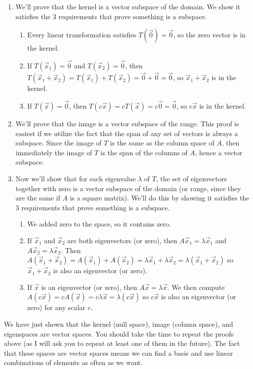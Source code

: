 \documentclass[10pt]{article}
\theoremstyle{plain}
\theoremstyle{box}
\begin{document}
\begin{enumerate}
	\item We'll prove that the kernel is a vector subspace of the domain. We show it satisfies the 3 requirements that prove something is a subspace. 
\begin{enumerate}
	\item Every linear transformation satisfies $T(\vec 0)=\vec 0$, so the zero vector is in the kernel.  
	\item If $T(\vec x_1)=\vec 0$ and $T(\vec x_2)=\vec 0$, then $T(\vec x_1+\vec x_2)=T(\vec x_1)+T(\vec x_2)=\vec 0+\vec 0=\vec 0$, so $\vec x_1+\vec x_2$ is in the kernel. 
	\item If $T(\vec x)=\vec 0$, then $T(c\vec x)=cT(\vec x)=c\vec 0=\vec 0$, so $c\vec x$ is in the kernel. 
\end{enumerate}

	\item We'll prove that the image is a vector subspace of the range. This proof is easiest if we utilize the fact that the span of any set of vectors is always a subspace.  Since the image of $T$ is the same as the column space of $A$, then immediately the image of $T$ is the span of the columns of $A$, hence a vector subspace.
	
	\item Now we'll show that for each eigenvalue $\lambda$ of $T$, the set of eigenvectors together with zero is a vector subspace of the domain (or range, since they are the same if $A$ is a square matrix).  We'll do this by showing it satisfies the 3 requirements that prove something is a subspace.
\begin{enumerate}
	\item We added zero to the space, so it contains zero.
	\item If $\vec x_1$ and $\vec x_2$ are both eigenvectors (or zero), then $A\vec x_1=\lambda \vec x_1$ and $A\vec x_2=\lambda \vec x_2$. Then $A(\vec x_1+\vec x_2)=A(\vec x_1)+A(\vec x_2)=\lambda \vec x_1+\lambda \vec x_2 = \lambda (\vec x_1+\vec x_2)$ so $\vec x_1+\vec x_2$ is also an eigenvector (or zero).
	\item If $\vec x$ is an eigenvector (or zero), then $A\vec x=\lambda \vec x$. We then compute $A(c\vec x)=cA(\vec x)=c\lambda \vec x= \lambda (c\vec x)$ so $c\vec x$ is also an eigenvector (or zero) for any scalar $c$.
\end{enumerate}
\end{enumerate}

We have just shown that the kernel (null space), image (column space), and eigenspaces are vector spaces. You should take the time to repeat the proofs above (as I will ask you to repeat at least one of them in the future). The fact that these spaces are vector spaces means we can find a basis and use linear combinations of elements as often as we want.  
\end{document}
